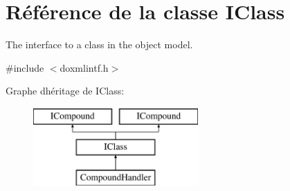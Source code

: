 \hypertarget{class_i_class}{}\section{Référence de la classe I\+Class}
\label{class_i_class}


The interface to a class in the object model.  




{\ttfamily \#include $<$doxmlintf.\+h$>$}

Graphe d\textquotesingle{}héritage de I\+Class\+:\begin{figure}[H]
\begin{center}
\leavevmode
\includegraphics[height=3.000000cm]{class_i_class}
\end{center}
\end{figure}
